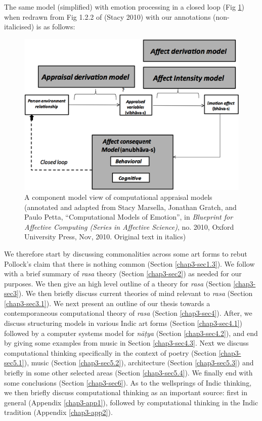 The same model (simplified) with emotion processing in a closed loop (Fig \ref{chap3-fig2}) when redrawn from Fig 1.2.2 of (Stacy 2010) with our annotations (non-italicised) is as follows:

\begin{figure}[H]
\centering
\includegraphics[scale=.9]{figures/4.eps}
\caption{A component model view of computational appraisal models (annotated and adapted from Stacy Marsella, Jonathan Gratch, and Paulo Petta, ``Computational Models of Emotion'', in \textsl{Blueprint for Affective Computing (Series in Affective Science)}, no. 2010, Oxford University Press, Nov, 2010. Original text in italics)}\label{chap3-fig2}
\end{figure}

We therefore start by discussing commonalities across some art forms to rebut Pollock’s claim that there is nothing common (Section \ref{chap3-sec1.3}). We follow with a brief summary of \textsl{rasa} theory (Section \ref{chap3-sec2}) as needed for our purposes. We then give an high level outline of a theory for \textsl{rasa} (Section \ref{chap3-sec3}). We then briefly discuss current theories of mind relevant to \textsl{rasa} (Section \ref{chap3-sec3.1}). We next present an outline of our thesis towards a contemporaneous computational theory of \textsl{rasa} (Section \ref{chap3-sec4}). After, we discuss structuring models in various Indic art forms (Section \ref{chap3-sec4.1}) followed by a computer systems model for \textsl{nāṭya} (Section \ref{chap3-sec4.2}), and end by giving some examples from music in Section \ref{chap3-sec4.3}. Next we discuss computational thinking specifically in the context of poetry (Section \ref{chap3-sec5.1}), music (Section \ref{chap3-sec5.2}), architecture (Section \ref{chap3-sec5.3}) and briefly in some other selected areas (Section \ref{chap3-sec5.4}). We finally end with some conclusions (Section \ref{chap3-sec6}). As to the wellsprings of Indic thinking, we then briefly discuss computational thinking as an important source: first in general (Appendix \ref{chap3-app1}), followed by computational thinking in the Indic tradition (Appendix \ref{chap3-app2}). 

